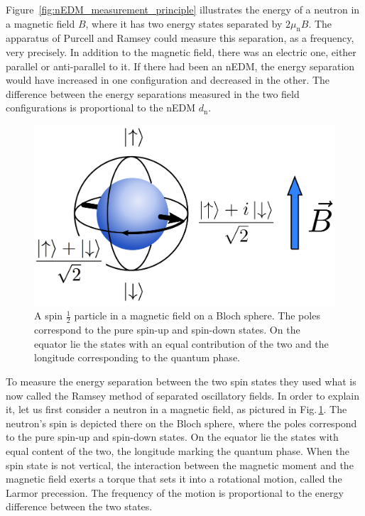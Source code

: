 Figure~\ref{fig:nEDM_measurement_principle} illustrates the energy of a neutron in a magnetic field $B$, where it has two energy states separated by $2 \mu_\text{n} B$. The apparatus of Purcell and Ramsey could measure this separation, as a frequency, very precisely. In addition to the magnetic field, there was an electric one, either parallel or anti-parallel to it. If there had been an nEDM, the energy separation would have increased in one configuration and decreased in the other. The difference between the energy separations measured in the two field configurations is proportional to the nEDM $d_\text{n}$.

\begin{figure}
  \centering
  \includegraphics[width=.6\linewidth]{gfx/nEDMatPSI/bloch_sphere.png}
  \caption{A spin $\tfrac{1}{2}$ particle in a magnetic field on a Bloch sphere. The poles correspond to the pure spin-up and spin-down states. On the equator lie the states with an equal contribution of the two and the longitude corresponding to the quantum phase.}\label{fig:nEDM_bloch_sphere}
\end{figure}

To measure the energy separation between the two spin states they used what is now called the Ramsey method of separated oscillatory fields. In order to explain it, let us first consider a neutron in a magnetic field, as pictured in Fig.\,\ref{fig:nEDM_bloch_sphere}. The neutron's spin is depicted there on the Bloch sphere, where the poles correspond to the pure spin-up and spin-down states. On the equator lie the states with equal content of the two, the longitude marking the quantum phase. When the spin state is not vertical, the interaction between the magnetic moment and the magnetic field exerts a torque that sets it into a rotational motion, called the Larmor precession. The frequency of the motion is proportional to the energy difference between the two states.

